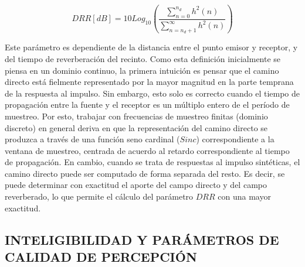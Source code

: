 \begin{equation}
\label{eqn:DRR}
	DRR  [dB]= 10 Log_{10}(\frac{\sum_{n=0}^{n_d}h^{2}(n)}{\sum_{n=n_{d}+1}^{\infty}h^{2}(n)}) 
\end{equation}

Este parámetro es dependiente de la distancia entre el punto emisor y receptor, y del tiempo de reverberación del recinto. Como esta definición inicialmente se piensa en un dominio continuo, la primera intuición es pensar que el camino directo está fielmente representado por la mayor magnitud en la parte temprana de la respuesta al impulso. Sin embargo, esto solo es correcto cuando el tiempo de propagación entre la fuente y el receptor es un múltiplo entero de el período de muestreo. Por esto, trabajar con frecuencias de muestreo finitas (dominio discreto) en general deriva en que la representación del camino directo se produzca a través de una función seno cardinal ($Sinc$) correspondiente a la ventana de muestreo, centrada de acuerdo al retardo correspondiente al tiempo de propagación. En cambio, cuando se trata de respuestas al impulso sintéticas, el camino directo puede ser computado de forma separada del resto. Es decir, se puede determinar con exactitud el aporte del campo directo y del campo reverberado, lo que permite el cálculo del parámetro $DRR$ con una mayor exactitud. 




\subsection[Inteligibilidad y parámetros de calidad de percepción]{INTELIGIBILIDAD Y PARÁMETROS DE CALIDAD DE PERCEPCIÓN}

